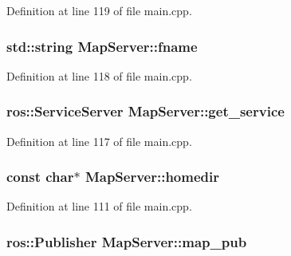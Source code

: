 Definition at line 119 of file main.\-cpp.

\hypertarget{classMapServer_ad6965ce117f3fd625ee154c9401adbd1}{
\subsubsection[{fname}]{\setlength{\rightskip}{0pt plus 5cm}std\-::string Map\-Server\-::fname\hspace{0.3cm}{\ttfamily [private]}}}\label{classMapServer_ad6965ce117f3fd625ee154c9401adbd1}


Definition at line 118 of file main.\-cpp.

\hypertarget{classMapServer_a9cf3f0c9eb77614d824d11a8b0e26494}{
\subsubsection[{get\-\_\-service}]{\setlength{\rightskip}{0pt plus 5cm}ros\-::\-Service\-Server Map\-Server\-::get\-\_\-service\hspace{0.3cm}{\ttfamily [private]}}}\label{classMapServer_a9cf3f0c9eb77614d824d11a8b0e26494}


Definition at line 117 of file main.\-cpp.

\hypertarget{classMapServer_afb9e1200e8b84b9cbc1e2d9fa9bb4f82}{
\subsubsection[{homedir}]{\setlength{\rightskip}{0pt plus 5cm}const char$\ast$ Map\-Server\-::homedir\hspace{0.3cm}{\ttfamily [private]}}}\label{classMapServer_afb9e1200e8b84b9cbc1e2d9fa9bb4f82}


Definition at line 111 of file main.\-cpp.

\hypertarget{classMapServer_a470be44b3a485ea9650f7b39bc41cb4b}{
\subsubsection[{map\-\_\-pub}]{\setlength{\rightskip}{0pt plus 5cm}ros\-::\-Publisher Map\-Server\-::map\-\_\-pub\hspace{0.3cm}{\ttfamily [private]}}}\label{classMapServer_a470be44b3a485ea9650f7b39bc41cb4b}


